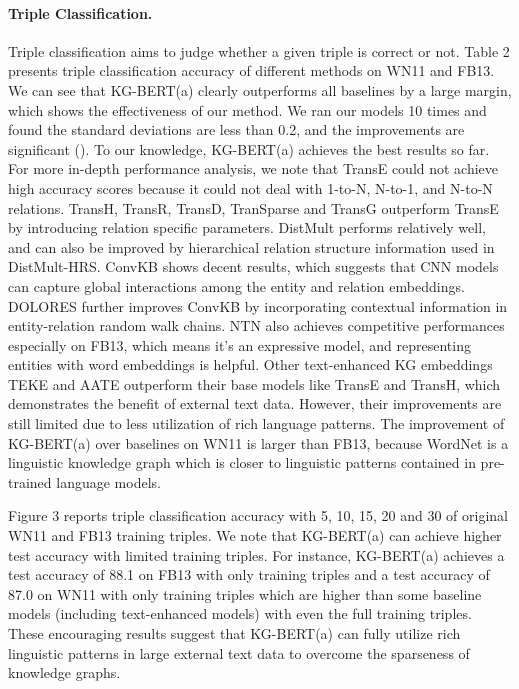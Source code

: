 \documentclass[letterpaper]{article} \usepackage{aaai20}  \usepackage{times}  \usepackage{helvet} \usepackage{courier}  \usepackage[hyphens]{url}  \usepackage{graphicx} \urlstyle{rm} \def\UrlFont{\rm}  \usepackage{graphicx}  \usepackage{amsmath}
\begin{document}
\paragraph{Triple Classification.}
Triple classification aims to judge whether a given triple  is correct or not. Table 2 presents triple classification accuracy of different methods on WN11 and FB13. We can see that KG-BERT(a) clearly outperforms all baselines by a large margin, which shows the effectiveness of our method. We ran our models 10 times and found the standard deviations are less than 0.2, and the improvements are significant (). To our knowledge, KG-BERT(a) achieves the best results so far. For more in-depth performance analysis, we note that TransE could not achieve high accuracy scores because it could not deal with 1-to-N, N-to-1, and N-to-N relations. TransH, TransR, TransD, TranSparse and TransG outperform TransE by introducing relation specific parameters. DistMult performs relatively well, and can also be improved by hierarchical relation structure information used in DistMult-HRS. ConvKB shows decent results, which suggests that CNN models can capture global interactions among the entity and relation embeddings. DOLORES further improves ConvKB by incorporating contextual information in entity-relation random walk chains. NTN also achieves competitive performances especially on FB13, which means it's an expressive model, and representing entities with word embeddings is helpful. Other text-enhanced KG embeddings TEKE and AATE outperform their base models like TransE and TransH, which demonstrates the benefit of external text data. However, their improvements are still limited due to less utilization of rich language patterns. The improvement of KG-BERT(a) over baselines on WN11 is larger than FB13, because WordNet is a linguistic knowledge graph which is closer to linguistic patterns contained in pre-trained language models.

Figure 3 reports triple classification accuracy with 5, 10, 15, 20 and 30 of original WN11 and FB13 training triples. We note that KG-BERT(a) can achieve higher test accuracy with limited training triples. For instance, KG-BERT(a) achieves a test accuracy of 88.1 on FB13 with only  training triples and a test accuracy of 87.0 on WN11 with only  training triples which are higher than some baseline models (including text-enhanced models) with even the full training triples. These encouraging results suggest that KG-BERT(a) can fully utilize rich linguistic patterns in large external text data to overcome the sparseness of knowledge graphs.
\end{document}
